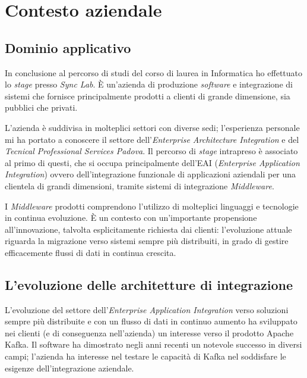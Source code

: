 \chapter{Contesto aziendale}

\section{Dominio applicativo}
In conclusione al percorso di studi del corso di laurea in Informatica ho effettuato lo \textit{stage} presso \textit{Sync Lab}.
È un'azienda di produzione \textit{software} e integrazione di sistemi che fornisce principalmente prodotti a clienti di grande dimensione, sia pubblici che privati.

L'azienda è suddivisa in molteplici settori con diverse sedi; l'esperienza personale mi ha portato a conoscere il settore dell'\textit{Enterprise Architecture Integration} e del \textit{Tecnical Professional Services Padova}.
Il percorso di \textit{stage} intrapreso è associato al primo di questi, che si occupa principalmente dell'EAI (\textit{Enterprise Application Integration}) ovvero dell'integrazione funzionale di applicazioni aziendali per una clientela di grandi dimensioni, tramite sistemi di integrazione \textit{Middleware}.

I \textit{Middleware} prodotti comprendono l'utilizzo di molteplici linguaggi e tecnologie in continua evoluzione.
È un contesto con un'importante propensione all'innovazione, talvolta esplicitamente richiesta dai clienti: l'evoluzione attuale riguarda la migrazione verso sistemi sempre più distribuiti, in grado di gestire efficacemente flussi di dati in continua crescita.

\section{L’evoluzione delle architetture di integrazione}

L'evoluzione del settore dell'\textit{Enterprise Application Integration} verso soluzioni sempre più distribuite e con un flusso di dati in continuo aumento ha sviluppato nei clienti (e di conseguenza nell'azienda) un interesse verso il prodotto Apache Kafka.
Il software ha dimostrato negli anni recenti un notevole successo in diversi campi; l'azienda ha interesse nel testare le capacità di Kafka nel soddisfare le esigenze dell'integrazione aziendale.

